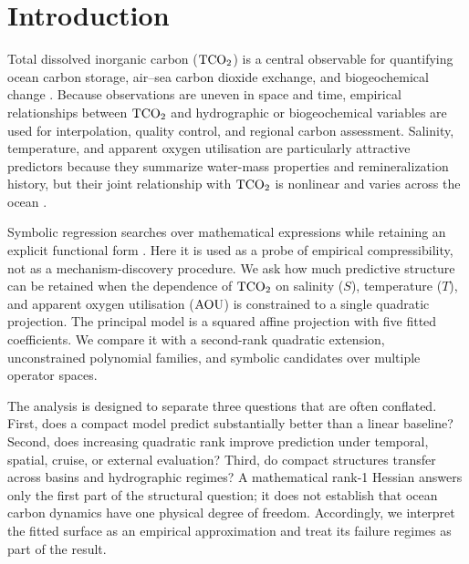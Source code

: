 \section{Introduction}

Total dissolved inorganic carbon ($\mathrm{TCO_2}$) is a central observable for quantifying ocean carbon storage, air--sea carbon dioxide exchange, and biogeochemical change \citep{Sarmiento2006,Takahashi1993,Key2004}. Because observations are uneven in space and time, empirical relationships between $\mathrm{TCO_2}$ and hydrographic or biogeochemical variables are used for interpolation, quality control, and regional carbon assessment. Salinity, temperature, and apparent oxygen utilisation are particularly attractive predictors because they summarize water-mass properties and remineralization history, but their joint relationship with $\mathrm{TCO_2}$ is nonlinear and varies across the ocean \citep{Goyet1991,Millero1998,Broullon2019}.

Symbolic regression searches over mathematical expressions while retaining an explicit functional form \citep{Cranmer2023}. Here it is used as a probe of empirical compressibility, not as a mechanism-discovery procedure. We ask how much predictive structure can be retained when the dependence of $\mathrm{TCO_2}$ on salinity ($S$), temperature ($T$), and apparent oxygen utilisation ($\mathrm{AOU}$) is constrained to a single quadratic projection. The principal model is a squared affine projection with five fitted coefficients. We compare it with a second-rank quadratic extension, unconstrained polynomial families, and symbolic candidates over multiple operator spaces.

The analysis is designed to separate three questions that are often conflated. First, does a compact model predict substantially better than a linear baseline? Second, does increasing quadratic rank improve prediction under temporal, spatial, cruise, or external evaluation? Third, do compact structures transfer across basins and hydrographic regimes? A mathematical rank-1 Hessian answers only the first part of the structural question; it does not establish that ocean carbon dynamics have one physical degree of freedom. Accordingly, we interpret the fitted surface as an empirical approximation and treat its failure regimes as part of the result.

